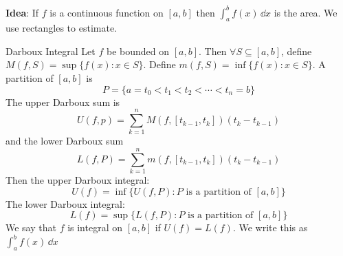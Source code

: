 \documentclass{report}
\begin{document}
\textbf{Idea}: If $f$ is a continuous function on $[a, b]$ then $\int_{a}^{b} f(x) \, \dd{x} $ is the area. We use rectangles to estimate.

\begin{definition}{Darboux Integral}
    Let $f$ be bounded on $[a, b]$. Then $\forall S \subseteq [a, b]$, define $M(f, S) = \sup \{f(x) : x \in S\}$. Define $m(f, S) = \inf \{f(x) : x \in S\}$. A partition of $[a, b]$ is 
        \begin{equation*}
            P = \{a = t_{0} < t_{1} < t_{2} < \cdots < t_{n} = b\}
        \end{equation*}
    The upper Darboux sum is 
        \begin{equation*}
            U(f, p) = \sum_{k = 1}^{n} M(f, [t_{k - 1}, t_{k}])(t_{k} - t_{k - 1})
        \end{equation*}
    and the lower Darboux sum
        \begin{equation*}
            L(f, P) = \sum_{k = 1}^{n}m(f, [t_{k - 1}, t_{k}])(t_{k} - t_{k - 1})
        \end{equation*}
    Then the upper Darboux integral:
        \begin{equation*}
            U(f) = \inf \{U(f, P) : P \text{ is a partition of $[a, b]$}\}
        \end{equation*}
    The lower Darboux integral:
        \begin{equation*}
            L(f) = \sup \{L(f, P) : P \text{ is a partition of $[a, b]$}\}
        \end{equation*}
    We say that $f$ is integral on $[a, b]$ if $U(f) = L(f)$. We write this as $\int_{a}^{b} f(x) \, \dd{x} $
\end{definition}
\end{document}

